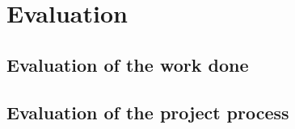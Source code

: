 \chapter{Evaluation}\label{evaluation}

\section{Evaluation of the work done}

\section{Evaluation of the project process}


